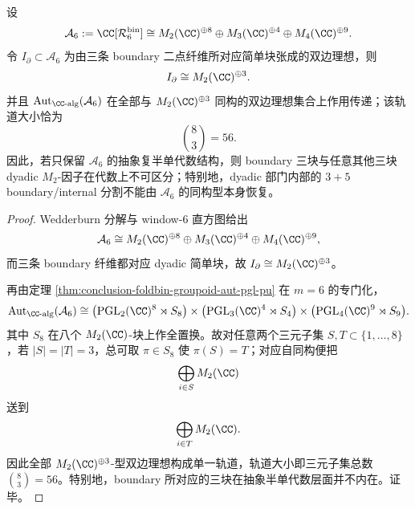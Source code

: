\begin{theorem}\label{thm:conclusion-window6-semisimple-boundary-forgetfulness}
设
\[
\mathcal A_6:=\CC[\mathcal R_6^{\mathrm{bin}}]
\cong
M_2(\CC)^{\oplus 8}\oplus M_3(\CC)^{\oplus 4}\oplus M_4(\CC)^{\oplus 9}.
\]
令 \(I_{\partial}\subset \mathcal A_6\) 为由三条 boundary 二点纤维所对应简单块张成的双边理想，则
\[
I_{\partial}\cong M_2(\CC)^{\oplus 3}.
\]
并且 \(\mathrm{Aut}_{\CC\text{-alg}}(\mathcal A_6)\) 在全部与 \(M_2(\CC)^{\oplus 3}\) 同构的双边理想集合上作用传递；该轨道大小恰为
\[
\binom{8}{3}=56.
\]
因此，若只保留 \(\mathcal A_6\) 的抽象复半单代数结构，则 boundary 三块与任意其他三块 dyadic \(M_2\)-因子在代数上不可区分；特别地，dyadic 部门内部的 \(3+5\) boundary/internal 分割不能由 \(\mathcal A_6\) 的同构型本身恢复。
\end{theorem}
\begin{proof}
Wedderburn 分解与 window-\(6\) 直方图给出
\[
\mathcal A_6
\cong
M_2(\CC)^{\oplus 8}\oplus M_3(\CC)^{\oplus 4}\oplus M_4(\CC)^{\oplus 9},
\]
而三条 boundary 纤维都对应 dyadic 简单块，故 \(I_{\partial}\cong M_2(\CC)^{\oplus 3}\)。

再由定理 \ref{thm:conclusion-foldbin-groupoid-aut-pgl-pu} 在 \(m=6\) 的专门化，
\[
\mathrm{Aut}_{\CC\text{-alg}}(\mathcal A_6)
\cong
\bigl(\operatorname{PGL}_2(\CC)^8\rtimes S_8\bigr)
\times
\bigl(\operatorname{PGL}_3(\CC)^4\rtimes S_4\bigr)
\times
\bigl(\operatorname{PGL}_4(\CC)^9\rtimes S_9\bigr).
\]
其中 \(S_8\) 在八个 \(M_2(\CC)\)-块上作全置换。故对任意两个三元子集 \(S,T\subset\{1,\dots,8\}\)，若 \(|S|=|T|=3\)，总可取 \(\pi\in S_8\) 使 \(\pi(S)=T\)；对应自同构便把
\[
\bigoplus_{i\in S} M_2(\CC)
\]
送到
\[
\bigoplus_{i\in T} M_2(\CC).
\]
因此全部 \(M_2(\CC)^{\oplus 3}\)-型双边理想构成单一轨道，轨道大小即三元子集总数 \(\binom{8}{3}=56\)。特别地，boundary 所对应的三块在抽象半单代数层面并不内在。证毕。
\end{proof}

